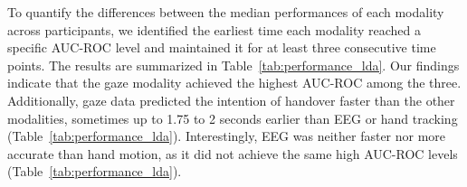 To quantify the differences between the median performances of each modality across participants, we identified the earliest time each modality reached a specific AUC-ROC level and maintained it for at least three consecutive time points. The results are summarized in Table~\ref{tab:performance_lda}. Our findings indicate that the gaze modality achieved the highest AUC-ROC among the three. Additionally, gaze data predicted the intention of handover faster than the other modalities, sometimes up to 1.75 to 2 seconds earlier than EEG or hand tracking (Table~\ref{tab:performance_lda}). Interestingly, EEG was neither faster nor more accurate than hand motion, as it did not achieve the same high AUC-ROC levels (Table~\ref{tab:performance_lda}).
\begin{comment}
\begin{table}[tb]
    \centering
    \begin{tabular}{ccccc}
        \toprule
        \multirow{2}{*}{AUC Levels-LDA} & \multicolumn{4}{c}{Time in secs} \\
        \cmidrule{2-5}
         & EEG & Gaze & Hand-Motion & \\
        \midrule
        0.60 & 3.0 & 1.5 & 3.5\\
        0.65 & 3.75 & 2.0 & 3.5\\
        0.70 & 3.75 & 2.25 & 3.75\\
        0.75 & 4.5 & 2.5 & 4.5 \\
        0.80 & X & 3.0 &  4.75\\
        0.85 & X & 4.0 & X \\
        0.90 & X & X & X \\
        \bottomrule
    \end{tabular}
    \caption{Time (in seconds) at which different AUC-ROC levels are reached for the median performance of each modality, with LDA. An AUC-ROC level is considered reached if it is sustained for at least three consecutive time steps; ``X" indicates the AUC-ROC level was not reached.}
    \label{tab:performance_lda}
\end{table}
\begin{table}[tb]
    \centering
    \begin{tabular}{ccccc}
        \toprule
        \multirow{2}{*}{AUC Levels-LSTM} & \multicolumn{4}{c}{Time in secs} \\
        \cmidrule{2-5}
         & EEG & Gaze & Hand-Motion & \\
        \midrule
        0.60 & X & 0.5 & 1.5\\

\end{comment}
